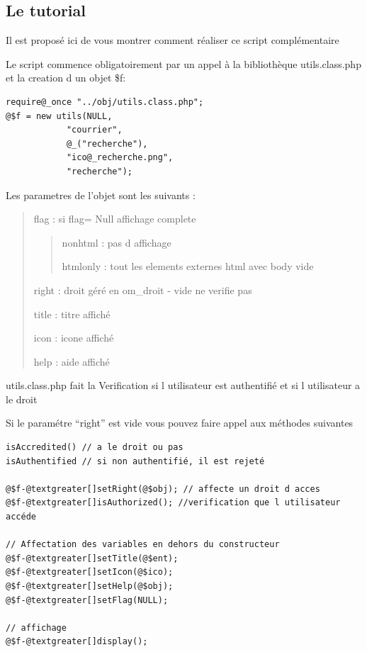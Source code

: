 \documentclass[letterpaper,10pt,french]{manual}
\begin{document}
\subsection{Le tutorial}

Il est proposé ici de vous montrer comment réaliser ce script complémentaire

Le script commence obligatoirement par un appel à la bibliothèque utils.class.php et la creation d un objet \$f:

\begin{Verbatim}[commandchars=@\[\]]
require@_once "../obj/utils.class.php";
@$f = new utils(NULL,
            "courrier",
            @_("recherche"),
            "ico@_recherche.png",
            "recherche");
\end{Verbatim}

Les parametres de l'objet sont les suivants :
\begin{quote}

flag : si flag= Null affichage complete
\begin{quote}

nonhtml : pas d affichage

htmlonly : tout les elements externes html avec body vide
\end{quote}

right : droit géré en om\_droit - vide ne verifie pas

title : titre affiché

icon  : icone affiché

help  : aide affiché
\end{quote}

utils.class.php fait la Verification si l utilisateur est authentifié et si l utilisateur a le droit

Si le paramétre ``right'' est vide vous pouvez faire appel aux méthodes suivantes

\begin{Verbatim}[commandchars=@\[\]]
isAccredited() // a le droit ou pas
isAuthentified // si non authentifié, il est rejeté

@$f-@textgreater[]setRight(@$obj); // affecte un droit d acces
@$f-@textgreater[]isAuthorized(); //verification que l utilisateur accéde

// Affectation des variables en dehors du constructeur
@$f-@textgreater[]setTitle(@$ent);
@$f-@textgreater[]setIcon(@$ico);
@$f-@textgreater[]setHelp(@$obj);
@$f-@textgreater[]setFlag(NULL);

// affichage
@$f-@textgreater[]display();
\end{Verbatim}
\end{document}
